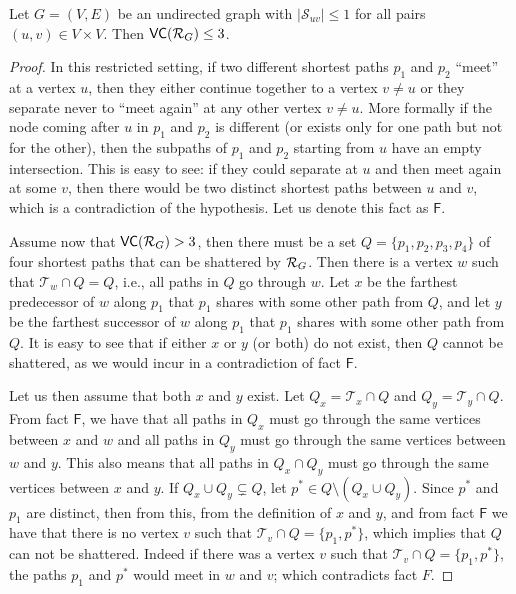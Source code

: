 \begin{lemma}\label{lem:vcdimuppboundunique}
  Let $G=(V,E)$ be an undirected graph with $|\mathcal{S}_{uv}|\le1$ for all
  pairs $(u,v)\in V\times V$. Then $\mathsf{VC}(\mathcal{R}_G)\le 3$.
\end{lemma}

\ifproof
\begin{proof}
  In this restricted setting, if two different shortest paths $p_1$ and $p_2$
  ``meet'' at a vertex $u$, then they either continue together to a vertex
  $v\neq u$ or they separate never to ``meet again'' at any other
  vertex $v\neq u$. More formally if the node coming after $u$ in $p_1$ and
  $p_2$ is different (or exists only for one path but not for the other), then
  the subpaths of $p_1$ and $p_2$ starting from $u$ have an empty intersection.
  This is easy to see: if they could separate at $u$ and then meet again at some
  $v$, then there would be two distinct shortest paths between $u$ and $v$,
  which is a contradiction of the hypothesis. Let us denote this fact as
  $\mathsf{F}$.  

  Assume now that $\mathsf{VC}(\mathcal{R}_G)>3$, then there must be a set
  $Q=\{p_1,p_2,p_3,p_4\}$ of four shortest paths that can be shattered by
  $\mathcal{R}_G$. Then there is a vertex $w$ such that $\mathcal{T}_w\cap Q=Q$, i.e.,
  all paths in $Q$ go through $w$. Let $x$ be the farthest predecessor of $w$
  along $p_1$ that $p_1$ shares with some other path from $Q$, and let $y$ be
  the farthest successor of $w$ along $p_1$ that $p_1$ shares with some other
  path from $Q$. It is easy to see that if either $x$ or $y$ (or both) do not
  exist, then $Q$ cannot be shattered, as we would incur in a contradiction of
  fact $\mathsf{F}$.
  
  Let us then assume that both $x$ and $y$ exist.
  Let $Q_x=\mathcal{T}_x\cap Q$ and $Q_y=\mathcal{T}_y\cap Q$.
  From fact $\mathsf{F}$, we have that all paths in $Q_x$ must go through the
  same vertices between $x$ and $w$ and all paths in $Q_y$ must go through the
  same vertices between $w$ and $y$. This also means that all paths in $Q_x\cap
  Q_y$ must go through the same vertices between $x$ and $y$. If $Q_x\cup
  Q_y\subsetneq Q$, let $p^*\in Q\setminus(Q_x\cup Q_y)$. Since $p^*$ and $p_1$
  are distinct, then from this, from the definition of $x$ and $y$, and from
  fact $\mathsf{F}$ we have that there is no vertex $v$ such that
  $\mathcal{T}_v\cap Q=\{p_1,p^*\}$, which implies that $Q$ can not be
  shattered. Indeed if there was a vertex $v$ such that $\mathcal{T}_v\cap
  Q=\{p_1,p^*\}$, the paths $p_1$ and $p^*$ would meet in $w$ and $v$; which
  contradicts fact $F$.
   

\end{proof}
